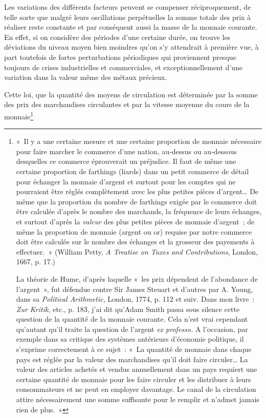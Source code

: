 \documentclass[french,twoside]{book} %
\begin{document}
Les variations des différents facteurs peuvent se compenser réciproquement, de telle sorte que malgré leurs oscillations perpétuelles la somme totale des prix à réaliser reste constante et par conséquent aussi la masse de la monnaie courante. En effet, si on considère des périodes d’une certaine durée, on trouve les déviations du niveau moyen bien moindres qu’on s’y attendrait à première vue, à part toutefois de fortes perturbations périodiques qui proviennent presque toujours de crises industrielles et commerciales, et exceptionnellement d’une variation dans la valeur même des métaux précieux.\par
Cette loi, que la quantité des moyens de circulation est déterminée par la somme des prix des marchandises circulantes et par la vitesse moyenne du cours de la monnaie\footnote{ \noindent « Il y a une certaine mesure et une certaine proportion de monnaie nécessaire pour faire marcher le commerce d’une nation, au‑dessus ou au‑dessous desquelles ce commerce éprouverait un préjudice. Il faut de même une certaine proportion de farthings (liards) dans un petit commerce de détail pour échanger la monnaie d’argent et surtout pour les comptes qui ne pourraient être réglés complètement avec les plus petites pièces d’argent… De même que la proportion du nombre de farthings exigée par le commerce doit être calculée d’après le nombre des marchands, la fréquence de leurs échanges, et surtout d’après la \emph{valeur} des plus petites pièces de monnaie d’argent ; de même la proportion de monnaie (argent ou or) requise par notre commerce doit être calculée sur le nombre des échanges et la grosseur des payements à effectuer. » (William Petty, \emph{A Treatise on Taxes and Contributions}, London, 1667, p. 17.)\par
 La théorie de Hume, d’après laquelle « les prix dépendent de l’abondance de l’argent », fut défendue contre Sir James Steuart et d’autres par A. Young, dans sa \emph{Political Arithmetic}, London, 1774, p. 112 et suiv. Dans mon livre : \emph{Zur Kritik}, etc., p. 183, j’ai dit qu’Adam Smith passa sous silence cette question de la quantité de la monnaie courante. Cela n’est vrai cependant qu’autant qu’il traite la question de l’argent \emph{ex professo.} A l’occasion, par exemple dans sa critique des systèmes antérieurs d’économie politique, il s’exprime correctement à ce sujet : « La quantité de monnaie dans chaque pays est réglée par la valeur des marchandises qu’il doit faire circuler… La valeur des articles achetés et vendus annuellement dans un pays requiert une certaine quantité de monnaie pour les faire circuler et les distribuer à leurs consommateurs et ne peut en employer davantage. Le canal de la circulation attire nécessairement une somme suffisante pour le remplir et n’admet jamais rien de plus. »\par
}
\end{document}
